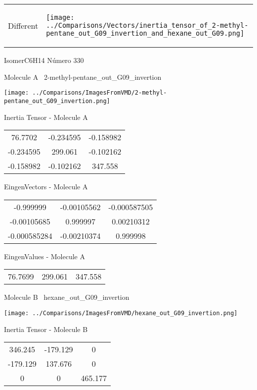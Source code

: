 \vtab[-5mm]
\begin{tabular}{*{2}{m{}}}
\begin{center}
\textcolor{NavyBlue}{\Large Different}
\end{center}
&
\begin{center}
\texttt{[image: ../Comparisons/Vectors/inertia\_tensor\_of\_2-methyl-pentane\_out\_G09\_invertion\_and\_hexane\_out\_G09.png]}
\end{center}
\end{tabular}

 \newpage

\vtab[-3cm]
\begin{center}
{\large IsomerC6H14 \tab Número 330}
\end{center}
\begin{multicols}{2}
\begin{center}

Molecule A \
2-methyl-pentane\_out\_G09\_invertion

\texttt{[image: ../Comparisons/ImagesFromVMD/2-methyl-pentane\_out\_G09\_invertion.png]}

Inertia Tensor - Molecule A \\
\begin{tabular}{|c c c|}
76.7702	 & 	-0.234595	 & 	-0.158982	 \\
-0.234595	 & 	299.061	 & 	-0.102162	 \\
-0.158982	 & 	-0.102162	 & 	347.558
\end{tabular}

\vtab
 EingenVectors - Molecule A     \\
\begin{tabular}{|c c c|}
-0.999999	 & 	-0.00105562	 & 	-0.000587505	 \\
-0.00105685	 & 	0.999997	 & 	0.00210312	 \\
-0.000585284	 & 	-0.00210374	 & 	0.999998
\end{tabular}

\vtab
 EingenValues - Molecule A     \\
\begin{tabular}{|c c c|}
76.7699	 & 	299.061	 & 	347.558	 \\
\end{tabular}
\columnbreak

Molecule B \
hexane\_out\_G09\_invertion

\texttt{[image: ../Comparisons/ImagesFromVMD/hexane\_out\_G09\_invertion.png]}

Inertia Tensor - Molecule B \\
\begin{tabular}{|c c c|}
346.245	 & 	-179.129	 & 	0	 \\
-179.129	 & 	137.676	 & 	0	 \\
0	 & 	0	 & 	465.177
\end{tabular}


\end{center}
\end{multicols}
